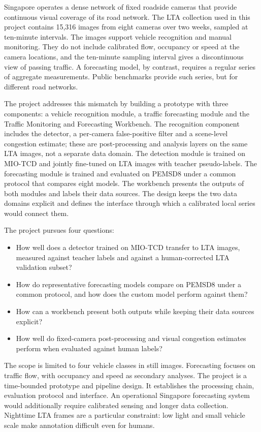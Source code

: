 Singapore operates a dense network of fixed roadside cameras that provide
continuous visual coverage of its road network. The LTA collection used in this
project contains 15,316 images from eight cameras over two weeks, sampled at
ten-minute intervals. The images support vehicle recognition and manual
monitoring. They do not include calibrated flow, occupancy or speed at the
camera locations, and the ten-minute sampling interval gives a discontinuous
view of passing traffic. A forecasting model, by contrast, requires a regular
series of aggregate measurements. Public benchmarks provide such series, but for
different road networks.

The project addresses this mismatch by building a prototype with three
components: a vehicle recognition module, a traffic forecasting module and the
Traffic Monitoring and Forecasting Workbench. The recognition component includes
the detector, a per-camera false-positive filter and a scene-level congestion
estimate; these are post-processing and analysis layers on the same LTA images,
not a separate data domain. The detection module is trained on MIO-TCD and
jointly fine-tuned on LTA images with teacher pseudo-labels. The forecasting
module is trained and evaluated on PEMSD8 under a common protocol that compares
eight models. The workbench presents the outputs of both modules and labels their
data sources. The design keeps the two data domains explicit and defines the
interface through which a calibrated local series would connect them.

The project pursues four questions:

\begin{itemize}
  \item How well does a detector trained on MIO-TCD transfer to LTA images,
        measured against teacher labels and against a human-corrected LTA
        validation subset?
  \item How do representative forecasting models compare on PEMSD8 under a
        common protocol, and how does the custom model perform against them?
  \item How can a workbench present both outputs while keeping their data sources
        explicit?
  \item How well do fixed-camera post-processing and visual congestion
        estimates perform when evaluated against human labels?
\end{itemize}

The scope is limited to four vehicle classes in still images. Forecasting
focuses on traffic flow, with occupancy and speed as secondary analyses. The
project is a time-bounded prototype and pipeline design. It establishes the
processing chain, evaluation protocol and interface. An operational Singapore
forecasting system would additionally require calibrated sensing and longer
data collection. Nighttime LTA frames are a particular constraint: low light and
small vehicle scale make annotation difficult even for humans.

